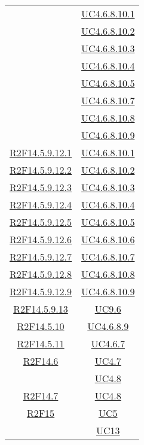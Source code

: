 \begin{longtable}{|c|c|}
& \hyperlink{UC4.6.8.10.1}{UC4.6.8.10.1}\\
& \hyperlink{UC4.6.8.10.2}{UC4.6.8.10.2}\\
& \hyperlink{UC4.6.8.10.3}{UC4.6.8.10.3}\\
& \hyperlink{UC4.6.8.10.4}{UC4.6.8.10.4}\\
& \hyperlink{UC4.6.8.10.5}{UC4.6.8.10.5}\\
& \hyperlink{UC4.6.8.10.7}{UC4.6.8.10.7}\\
& \hyperlink{UC4.6.8.10.8}{UC4.6.8.10.8}\\
& \hyperlink{UC4.6.8.10.9}{UC4.6.8.10.9}\\
\hline
\hyperlink{R2F14.5.9.12.1}{R2F14.5.9.12.1} & \hyperlink{UC4.6.8.10.1}{UC4.6.8.10.1}\\
\hline
\hyperlink{R2F14.5.9.12.2}{R2F14.5.9.12.2} & \hyperlink{UC4.6.8.10.2}{UC4.6.8.10.2}\\
\hline
\hyperlink{R2F14.5.9.12.3}{R2F14.5.9.12.3} & \hyperlink{UC4.6.8.10.3}{UC4.6.8.10.3}\\
\hline
\hyperlink{R2F14.5.9.12.4}{R2F14.5.9.12.4} & \hyperlink{UC4.6.8.10.4}{UC4.6.8.10.4}\\
\hline
\hyperlink{R2F14.5.9.12.5}{R2F14.5.9.12.5} & \hyperlink{UC4.6.8.10.5}{UC4.6.8.10.5}\\
\hline
\hyperlink{R2F14.5.9.12.6}{R2F14.5.9.12.6} & \hyperlink{UC4.6.8.10.6}{UC4.6.8.10.6}\\
\hline
\hyperlink{R2F14.5.9.12.7}{R2F14.5.9.12.7} & \hyperlink{UC4.6.8.10.7}{UC4.6.8.10.7}\\
\hline
\hyperlink{R2F14.5.9.12.8}{R2F14.5.9.12.8} & \hyperlink{UC4.6.8.10.8}{UC4.6.8.10.8}\\
\hline
\hyperlink{R2F14.5.9.12.9}{R2F14.5.9.12.9} & \hyperlink{UC4.6.8.10.9}{UC4.6.8.10.9}\\
\hline
\hyperlink{R2F14.5.9.13}{R2F14.5.9.13} & \hyperlink{UC9.6}{UC9.6}\\
\hline
\hyperlink{R2F14.5.10}{R2F14.5.10} & \hyperlink{UC4.6.8.9}{UC4.6.8.9}\\
\hline
\hyperlink{R2F14.5.11}{R2F14.5.11} & \hyperlink{UC4.6.7}{UC4.6.7}\\
\hline
\hyperlink{R2F14.6}{R2F14.6} & \hyperlink{UC4.7}{UC4.7}\\
& \hyperlink{UC4.8}{UC4.8}\\
\hline
\hyperlink{R2F14.7}{R2F14.7} & \hyperlink{UC4.8}{UC4.8}\\
\hline
\hyperlink{R2F15}{R2F15} & \hyperlink{UC5}{UC5}\\
& \hyperlink{UC13}{UC13}\\

\end{longtable}

